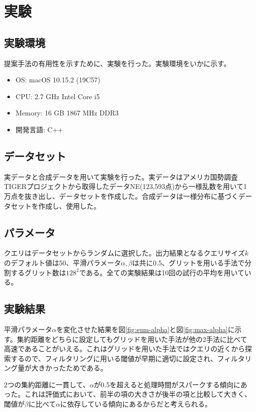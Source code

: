 \documentclass{deimj}
\begin{document}
\section{実験}
\subsection{実験環境}
提案手法の有用性を示すために、実験を行った。実験環境をいかに示す。
\begin{itemize}
  \item OS: macOS 10.15.2 (19C57)
  \item CPU: 2.7 GHz Intel Core i5
  \item Memory: 16 GB 1867 MHz DDR3
  \item 開発言語: C++
\end{itemize}

\subsection{データセット}
実データと合成データを用いて実験を行った。実データはアメリカ国勢調査TIGERプロジェクト\cite{chorochronos}から取得したデータNE(123,593点)から一様乱数を用いて1万点を抜き出し、データセットを作成した。合成データは一様分布に基づくデータセットを作成し、使用した。

\subsection{パラメータ}
クエリはデータセットからランダムに選択した。出力結果となるクエリサイズ$k$のデフォルト値は50、平滑パラメータ$\alpha, \beta$は共に0.5、グリットを用いる手法で分割するグリット数は$128^2$である。全ての実験結果は10回の試行の平均を用いている。

\subsection{実験結果}
平滑パラメータ$\alpha$を変化させた結果を図\ref{fig:sum-alpha}と図\ref{fig:max-alpha}に示す。集約距離をどちらに設定してもグリッドを用いた手法が他の2手法に比べて高速であることがいえる。これはグリッドを用いた手法ではクエリの近くから探索するので、フィルタリングに用いる閾値が早期に適切に設定され、フィルタリング量が大きかったためである。

2つの集約距離に一貫して、$\alpha$が0.5を超えると処理時間がスパークする傾向にあった。これは評価式において、前半の項の大きさが後半の項と比較して大きく、閾値が$\beta$に比べて$\alpha$に依存している傾向にあるからだと考えられる。
\end{document}
